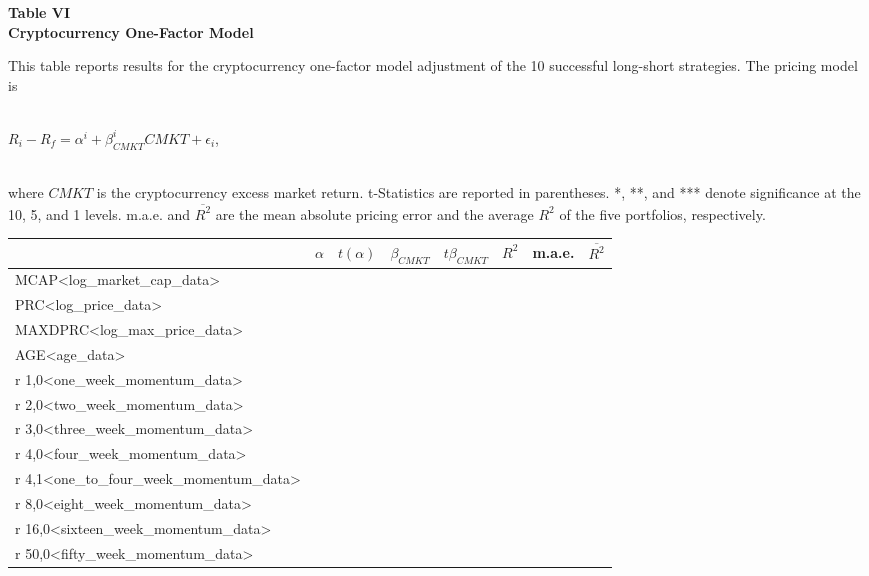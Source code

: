\documentclass{article}
\begin{document}
    \begin{center}
        \textbf{
        Table VI
        \\
        Cryptocurrency One-Factor Model
        }
        \begin{justify}
            \footnotesize{
                This table reports results for the cryptocurrency one-factor model adjustment of the 10 successful long-short strategies. The pricing model is
            }
            \\
            \\
            \footnotesize{
                \centerline{
                    $R_i-R_f=\alpha^i+\beta^i_{CMKT}CMKT+\epsilon_i$,
                }
            }
            \\
            \footnotesize{
                where $CMKT$ is the cryptocurrency excess market return. t-Statistics are reported in parentheses. *, **, and *** denote significance at the 10, 5, and 1 levels. m.a.e. and $\overline{R^2}$ are the mean absolute pricing error and the average $R^2$ of the five portfolios, respectively.
            }
        \end{justify}
        \-
        \begin{tabular}{lccccccr}
            \toprule
            & $\alpha$ & $t(\alpha)$ & $\beta_{CMKT}$ & $t\beta_{CMKT}$ & $R^2$ & m.a.e. & $\overline{R^2}$
            \\
            \midrule
            MCAP<log_market_cap_data>
            \\
            PRC<log_price_data>
            \\
            MAXDPRC<log_max_price_data>
            \\
            AGE<age_data>
            \\
            r 1,0<one_week_momentum_data>
            \\
            r 2,0<two_week_momentum_data>
            \\
            r 3,0<three_week_momentum_data>
            \\
            r 4,0<four_week_momentum_data>
            \\
            r 4,1<one_to_four_week_momentum_data>
            \\
            r 8,0<eight_week_momentum_data>
            \\
            r 16,0<sixteen_week_momentum_data>
            \\
            r 50,0<fifty_week_momentum_data>

\end{tabular}
\end{center}
\end{document}

